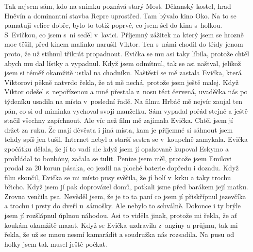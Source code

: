 
Tak nejsem sám, kdo na snímku poznává starý Most. Děkanský kostel,
hrad Hněvín a dominantní stavba Repre uprostřed. Tam bývalo kino Oko.
Na to se pamatuji velice dobře, bylo to totiž poprvé, co jsem šel do
kina s~holkou. S~Evičkou, co jsem s~ní seděl v~lavici. Příjemný
zážitek na který jsem se hrozně moc těšil, před kinem malinko narušil
Viktor. Ten s~námi chodil do třídy jenom proto, že už stihnul třikrát
propadnout. Evička se mu asi taky líbila, protože chtěl abych mu dal
lístky a vypadnul. Když jsem odmítnul, tak se asi naštval, jelikož
jsem si téměř okamžitě ustlal na chodníku. Naštěstí se mě zastala
Evička, která Viktorovi pěkně natvrdo řekla, že ať mě nechá, protože
jsem ještě malej. Když Viktor odešel s~nepořízenou a mně přestala
z~nosu téct červená, uvaděčka nás po týdeníku usadila na místa
v~poslední řadě. Na filmu Hrbáč mě nejvíc zaujal ten pán, co si od
miminka vychoval svojí manželku. Sám vypadal pořád stejně a ještě
stačil všechny zapíchnout. Ale víc než film mě zajímala Evička. Chtěl
jsem jí držet za ruku. Že mají děvčata i jiná místa, kam je příjemné
si sáhnout jsem tehdy spíš jen tušil. Internet nebyl a starší sestra
se v~koupelně zamykala. Evička zpočátku dělala, že jí to vadí ale když
jsem jí opakovaně kupoval Eskymo a prokládal to bonbóny, začala se
tulit. Peníze jsem měl, protože jsem Emilovi prodal za 20 korun
pásaka, co jezdil na ploché baterie dopředu i dozadu. Když film
skončil, Evička se mi místo pusy svěřila, že jí bolí v~krku a taky
trochu břicho. Když jsem jí pak doprovázel domů, potkali jsme před
barákem její matku. Zrovna venčila psa. Nevěděl jsem, že je to ta paní
co jsem jí přiskřípnul jezevčíka a trochu i prsty do dveří u~sámošky.
Ale nebylo to schválně. Dokonce i ty brýle jsem jí rozšlápnul úplnou
náhodou. Asi to viděla jinak, protože mi řekla, že ať koukám okamžitě
mazat. Když se Evička uzdravila z~angíny a průjmu, tak mi řekla, že už
se mnou nesmí kamarádit a soudružka nás rozsadila. Na pusu od holky
jsem tak musel ještě počkat.
